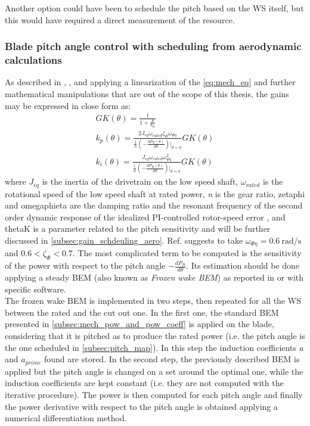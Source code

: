 Another option could have been to schedule the pitch based on the \acrshort{WS} itself, but this would have required a direct measurement of the resource. 

\subsubsection{Blade pitch angle control with scheduling from aerodynamic calculations}\label{subsec:gain_schdeuling_aero}
As described in \cite{Aerodynamics_of_wind_turbines}, \cite{NREL_5MW_reference}, and \cite{ris_r_1500} applying a linearization of the \autoref{eq:mech_eq} and further mathematical manipulations that are out of the scope of this thesis,  the gains may be expressed in close form as:
\begin{gather}
    GK(\theta) = \frac{1}{1+\frac{\theta}{\theta_K}} \label{eq:GK}\\
    k_p(\theta) = \frac{2J_{eq}\omega_{rated}\zeta_{\Phi}\omega_{\Phi\eta}}{\frac{1}{n}\left(-\frac{dP_R(\theta)}{d\theta}\right)\lvert_{\theta=0}}GK(\theta)
    \label{eq:kp}\\
    k_i(\theta) = \frac{J_{eq}\omega_{rated}\omega_{\Phi\eta}^2}{\frac{1}{n}\left(-\frac{dP_R(\theta)}{d\theta}\right)\lvert_{\theta=0}}GK(\theta)
    \label{eq:ki}
\end{gather}
where $J_{eq}$ is the inertia of the drivetrain on the low speed shaft, $\omega_{rated}$ is the rotational speed of the low speed shaft at rated power, \textit{n} is the gear ratio, \acrshort{zetaphi} and \acrshort{omegaphieta} are the damping ratio and the resonant frequency of the second order dynamic response of the idealized PI-controlled rotor-speed error \cite{NREL_5MW_reference}, and \acrshort{thetaK} is a parameter related to the pitch sensitivity and will be further discussed in \autoref{subsec:gain_schdeuling_aero}. Ref. \cite{NREL_5MW_reference} suggests to take $\omega_{\Phi\eta}=0.6 \ \si{\radian\per\second}$ and $0.6<\zeta_{\Phi}<0.7$. The most complicated term to be computed is the sensitivity of the power with respect to the pitch angle $-\frac{dP_R}{d\theta}$. Its estimation should be done applying a steady \acrshort{BEM} (also known as \textit{Frozen wake BEM}) as reported in \cite{Aerodynamics_of_wind_turbines} or with specific software. \\
The frozen wake BEM is implemented in two steps, then repeated for all the \acrshort{WS} between the rated and the cut out one. In the first one, the standard BEM presented in \autoref{subsec:mech_pow_and_pow_coeff} is applied on the blade, considering that it is pitched as to produce the rated power (i.e. the pitch angle is the one scheduled in \autoref{subsec:pitch_map}). In this step the induction coefficients \textit{a} and \textit{$a_{prime}$} found are stored. In the second step, the previously described BEM is applied but the pitch angle is changed on a set around the optimal one, while the induction coefficients are kept constant (i.e. they are not computed with the iterative procedure). The power is then computed for each pitch angle and finally the power derivative with respect to the pitch angle is obtained applying a numerical differentiation method.

